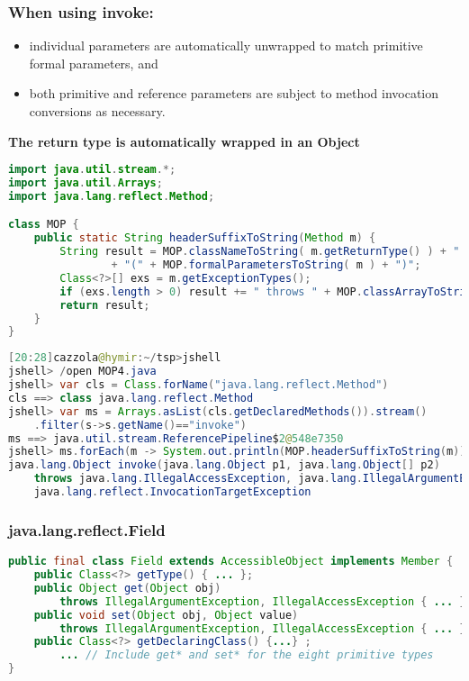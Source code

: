 \subsubsection{When using invoke:}

\begin{itemize}
	\item individual parameters are automatically unwrapped to match primitive formal parameters, and
	\item both primitive and reference parameters are subject to method
invocation conversions as necessary.
\end{itemize}

\textbf{The return type is automatically wrapped in an Object}

\begin{lstlisting}[language=Java]
import java.util.stream.*;
import java.util.Arrays;
import java.lang.reflect.Method;

class MOP {
	public static String headerSuffixToString(Method m) {
		String result = MOP.classNameToString( m.getReturnType() ) + " " + m.getName()
				+ "(" + MOP.formalParametersToString( m ) + ")";
		Class<?>[] exs = m.getExceptionTypes();
		if (exs.length > 0) result += " throws " + MOP.classArrayToString(exs);
		return result;
	}
}
\end{lstlisting}

\begin{lstlisting}[language=Java]
[20:28]cazzola@hymir:~/tsp>jshell
jshell> /open MOP4.java
jshell> var cls = Class.forName("java.lang.reflect.Method")
cls ==> class java.lang.reflect.Method
jshell> var ms = Arrays.asList(cls.getDeclaredMethods()).stream()
	.filter(s->s.getName()=="invoke")
ms ==> java.util.stream.ReferencePipeline$2@548e7350
jshell> ms.forEach(m -> System.out.println(MOP.headerSuffixToString(m)))
java.lang.Object invoke(java.lang.Object p1, java.lang.Object[] p2)
	throws java.lang.IllegalAccessException, java.lang.IllegalArgumentException,
	java.lang.reflect.InvocationTargetException
\end{lstlisting}

\subsubsection{java.lang.reflect.Field}

\begin{lstlisting}[language=Java]
public final class Field extends AccessibleObject implements Member {
	public Class<?> getType() { ... };
	public Object get(Object obj)
		throws IllegalArgumentException, IllegalAccessException { ... };
	public void set(Object obj, Object value)
		throws IllegalArgumentException, IllegalAccessException { ... };
	public Class<?> getDeclaringClass() {...} ;
		... // Include get* and set* for the eight primitive types
}
\end{lstlisting}

